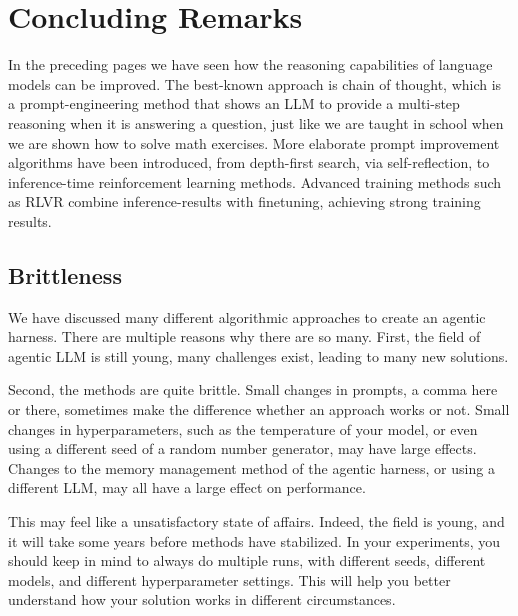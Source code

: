 \section{Concluding Remarks}
In the preceding pages we have seen how the reasoning capabilities of language models can be improved. The best-known approach is chain of thought, which is a prompt-engineering method that shows an LLM to provide a multi-step reasoning when it is answering a question, just like we are taught in school when we are shown how to solve math exercises. More elaborate prompt improvement algorithms have been introduced, from depth-first search, via self-reflection, to inference-time reinforcement learning methods. Advanced training methods such as RLVR combine inference-results with finetuning, achieving strong training results. 

\subsection{Brittleness}%
We have discussed many different algorithmic approaches to create an agentic harness. There are multiple reasons why there are so many. First, the field of agentic LLM is still young, many challenges exist, leading to many new solutions. 

Second, %
the methods are quite brittle. Small changes in prompts, a comma here or there,  sometimes make the difference whether an approach works or not. Small changes in hyperparameters, such as the temperature of your model, or even using a different seed of a random number generator, may have large effects. Changes to  the memory management method of the agentic harness, or using a different LLM, may all have a large effect on performance. 

This may feel like a  unsatisfactory state of affairs. Indeed, the field is young, and it will take some years before methods have stabilized. In your experiments, you should keep in mind to always do multiple runs, with different seeds, different models, and different hyperparameter settings. This will help you better understand how your solution works in different circumstances. 

